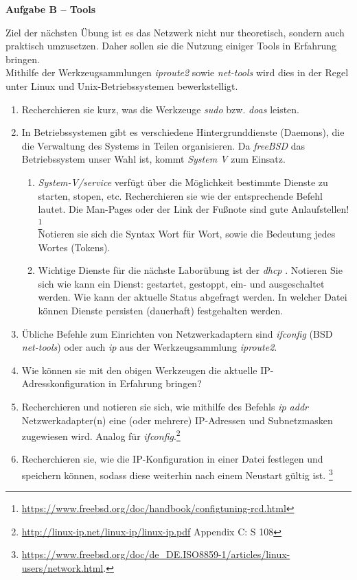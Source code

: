 \documentclass[paper=a4,fontsize=11pt]{scrartcl}%
\numberwithin{equation}{section}
\begin{document}
\begin{center}\Large{\textbf{Aufgabe B -- Tools}}\end{center}
Ziel der nächsten Übung ist es das Netzwerk nicht nur theoretisch, sondern auch praktisch umzusetzen. Daher sollen sie die Nutzung einiger Tools in Erfahrung bringen.\\
Mithilfe der Werkzeugsammlungen \emph{iproute2} sowie \emph{net-tools} wird dies in der Regel unter Linux und Unix-Betriebssystemen bewerkstelligt.
\begin{enumerate}
	\item Recherchieren sie kurz, was die Werkzeuge \emph{sudo} bzw. \emph{doas} leisten.
	\item In Betriebssystemen gibt es verschiedene Hintergrunddienste (Daemons), die die Verwaltung des Systems in Teilen organisieren. Da \emph{freeBSD} das Betriebssystem unser Wahl ist, kommt \emph{System V} zum Einsatz.
	\begin{enumerate}
		\item \emph{System-V/service} verfügt über die Möglichkeit bestimmte Dienste zu starten, stopen, etc. Recherchieren sie wie der entsprechende Befehl lautet. Die Man-Pages oder der Link der Fußnote sind gute Anlaufstellen!
		\footnote{\url{https://www.freebsd.org/doc/handbook/configtuning-rcd.html}}\\
		Notieren sie sich die Syntax Wort für Wort, sowie die Bedeutung jedes Wortes (Tokens). 
		\item Wichtige Dienste für die nächste Laborübung ist der \emph{dhcp} . Notieren Sie sich wie kann ein Dienst: gestartet, gestoppt, ein- und ausgeschaltet werden. Wie kann der aktuelle Status abgefragt werden. In welcher Datei können Dienste persisten (dauerhaft) festgehalten werden.
	\end{enumerate}
	\item Übliche Befehle zum Einrichten von Netzwerkadaptern sind \emph{ifconfig} (BSD \emph{net-tools}) oder auch \emph{ip} aus der Werkzeugsammlung \emph{iproute2}. 
 	\item Wie können sie mit den obigen Werkzeugen die aktuelle IP-Adresskonfiguration in Erfahrung bringen?
	\item Recherchieren und notieren sie sich, wie mithilfe des Befehls \emph{ip addr} Netzwerkadapter(n) eine (oder mehrere) IP-Adressen und Subnetzmasken zugewiesen wird. Analog für \emph{ifconfig}.\footnote{\url{http://linux-ip.net/linux-ip/linux-ip.pdf} Appendix C: S 108}\\
	\item Recherchieren sie, wie die IP-Konfiguration in einer Datei festlegen und speichern können, sodass diese weiterhin nach einem Neustart gültig ist.  \footnote{\url{https://www.freebsd.org/doc/de_DE.ISO8859-1/articles/linux-users/network.html}.}

\end{enumerate}
\end{document}
